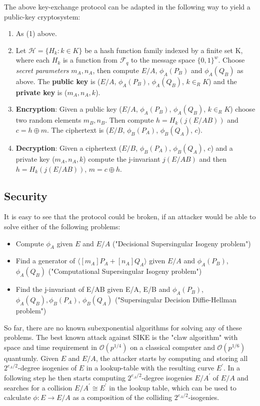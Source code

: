 The above key-exchange protocol can be adapted in the following way to yield a public-key cryptosystem: 
\begin{enumerate}[(1)]
	\item As (1) above.
	\item Let $\mathcal{H}= \{H_k:k\in K\}$ be a hash function family indexed by a finite set K, where each $H_k$ is a function from $\mathcal{F}_q$ to the message space $\{0,1\}^w$. Choose \textit{secret parameters} $m_A,n_A$, then compute $E/A$, $\phi_A(P_B)$ and $\phi_A(Q_B)$ as above. The \textbf{public key} is ($E/A$, $\phi_A(P_B)$, $\phi_A(Q_B)$, $k\in_R K$) and the \textbf{private key} is ($m_A,n_A,k$).
	\item \textbf{Encryption}: Given a public key ($E/A$, $\phi_A(P_B)$, $\phi_A(Q_B)$, $k\in_R K$) choose two random elements $m_B,n_B$. Then compute $h=H_k(j(E/AB))$ and $c=h\oplus m$. The ciphertext is ($E/B$, $\phi_B(P_A)$, $\phi_B(Q_A)$, $c$).
	\item \textbf{Decryption}: Given a ciphertext ($E/B$, $\phi_B(P_A)$, $\phi_B(Q_A)$, $c$) and a private key ($m_A,n_A,k$) compute the j-invariant $j(E/AB)$ and then $h = H_k(j(E/AB))$, $m=c\oplus h$.
\end{enumerate}

	
\subsection{Security}
It is easy to see that the protocol could be broken, if an attacker would be able to solve either of the following problems:
	
	\begin{itemize}[\textbullet]
		\item Compute $\phi_A$ given $E$ and $E/A$ ("Decisional Supersingular Isogeny problem")
		\item Find a generator  of $\langle[m_A]P_A + [n_A]Q_A\rangle$ given $E/A$ and $\phi_A(P_B)$, $\phi_A(Q_B)$ ("Computational Supersingular Isogeny problem")
		\item Find the j-invariant of E/AB given E/A, E/B and $\phi_A(P_B)$, $\phi_A(Q_B),\phi_B(P_A)$, $\phi_B(Q_A)$ ("Supersingular Decision Diffie-Hellman problem")
	\end{itemize}

So far, there are no known subexponential algorithms for solving any of these problems. The best known attack against SIKE is the "claw algorithm" with space and time requirement in $\mathcal{O}(p^{1/4})$ on a classical computer and $\mathcal{O}(p^{1/6})$ quantumly. Given $E$ and $E/A$, the attacker starts by computing and storing all $2^{e_A/2}$-degree isogenies of $E$ in a lookup-table with the resulting curve $E^{\prime}$. In a following step he then starts computing $2^{e_A/2}$-degree isogenies $E/A^{\prime}$ of $E/A$ and searches for a collision $E/A^{\prime} \cong E^{\prime}$ in the lookup table, which can be used to calculate $\phi:E \to E/A$ as a composition of the colliding $2^{e_A/2}$-isogenies.\\

